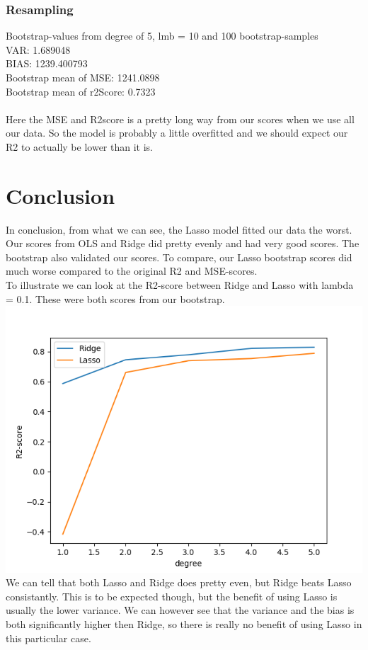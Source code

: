 \documentclass[a4paper,norsk]{article}
\begin{document}
\subsubsection{Resampling}
Bootstrap-values from degree of 5, lmb = 10 and 100 bootstrap-samples
\\VAR: 1.689048
\\BIAS: 1239.400793
\\Bootstrap mean of MSE: 1241.0898
\\Bootstrap mean of r2Score: 0.7323
\\
\\Here the MSE and R2score is a pretty long way from our scores when we use all our data. So the model is probably a little overfitted and we should expect our R2 to actually be lower than it is.
\clearpage
\section{Conclusion}

\par
In conclusion, from what we can see, the Lasso model fitted our data the worst. Our scores from OLS and Ridge did pretty evenly and had very good scores. The bootstrap also validated our scores. To compare, our Lasso bootstrap scores did much worse compared to the original R2 and MSE-scores.
\\To illustrate we can look at the R2-score between Ridge and Lasso with lambda = 0.1. These were both scores from our bootstrap.
\\ \includegraphics[scale=.7]{R2realdata1e-1}
\\We can tell that both Lasso and Ridge does pretty even, but Ridge beats Lasso consistantly. This is to be expected though, but the benefit of using Lasso is usually the lower variance. We can however see that the variance and the bias is both significantly higher then Ridge, so there is really no benefit of using Lasso in this particular case.

{}

\end{document}
